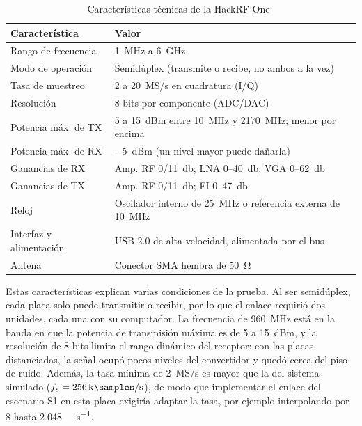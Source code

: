 \begin{table}[!t]
\centering
\caption{Características técnicas de la HackRF One~\cite{hackrfdocs,pysdr}}
\label{tab:hackrf}
\footnotesize
\setlength{\tabcolsep}{3pt}
\begin{tabular}{@{}p{}p{}@{}}
\toprule
\textbf{Característica} & \textbf{Valor} \\
\midrule
Rango de frecuencia & \SI{1}{\mega\hertz} a \SI{6}{\giga\hertz} \\
Modo de operación & Semidúplex (transmite o recibe, no ambos a la vez) \\
Tasa de muestreo & 2 a 20~MS/s en cuadratura (I/Q) \\
Resolución & 8 bits por componente (ADC/DAC) \\
Potencia máx. de TX & 5 a \SI{15}{dBm} entre \SI{10}{\mega\hertz} y \SI{2170}{\mega\hertz}; menor por encima \\
Potencia máx. de RX & \SI{-5}{dBm} (un nivel mayor puede dañarla) \\
Ganancias de RX & Amp. RF 0/\SI{11}{\decibel}; LNA 0--\SI{40}{\decibel}; VGA 0--\SI{62}{\decibel} \\
Ganancias de TX & Amp. RF 0/\SI{11}{\decibel}; FI 0--\SI{47}{\decibel} \\
Reloj & Oscilador interno de \SI{25}{\mega\hertz} o referencia externa de \SI{10}{\mega\hertz} \\
Interfaz y alimentación & USB 2.0 de alta velocidad, alimentada por el bus \\
Antena & Conector SMA hembra de \SI{50}{\ohm} \\
\bottomrule
\end{tabular}
\end{table}

Estas características explican varias condiciones de la prueba. Al ser
semidúplex, cada placa solo puede transmitir o recibir, por lo que el enlace
requirió dos unidades, cada una con su computador. La frecuencia de
\SI{960}{\mega\hertz} está en la banda en que la potencia de transmisión
máxima es de 5 a \SI{15}{dBm}, y la resolución de 8 bits limita el rango
dinámico del receptor: con las placas distanciadas, la señal ocupó pocos
niveles del convertidor y quedó cerca del piso de ruido. Además, la tasa mínima
de 2~MS/s es mayor que la del sistema simulado
($f_s=\SI{256}{\kilo\samples\per\second}$), de modo que implementar el enlace
del escenario S1 en esta placa exigiría adaptar la tasa, por ejemplo
interpolando por 8 hasta \SI{2,048}{\mega\samples\per\second}.

